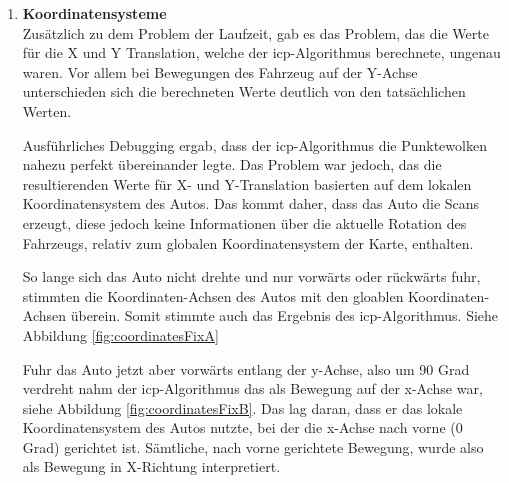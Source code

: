 \begin{enumerate}[leftmargin=*]
    \item \textbf{Koordinatensysteme} \\
    \label{coordinates_problem}Zusätzlich zu dem Problem der Laufzeit, gab es das Problem, das die Werte für die X und Y Translation, welche der \ac{icp}-Algorithmus berechnete, ungenau waren.
    Vor allem bei Bewegungen des Fahrzeug auf der Y-Achse unterschieden sich die berechneten Werte deutlich von den tatsächlichen Werten.
    
    Ausführliches Debugging ergab, dass der \ac{icp}-Algorithmus die Punktewolken nahezu perfekt übereinander legte.
    Das Problem war jedoch, das die resultierenden Werte für X- und Y-Translation basierten auf dem lokalen Koordinatensystem des Autos.
    Das kommt daher, dass das Auto die Scans erzeugt, diese jedoch keine Informationen über die aktuelle Rotation des Fahrzeugs, 
    relativ zum globalen Koordinatensystem der Karte, enthalten.
    
    So lange sich das Auto nicht drehte und nur vorwärts oder rückwärts fuhr, stimmten die Koordinaten-Achsen des Autos mit den gloablen Koordinaten-Achsen überein. 
    Somit stimmte auch das Ergebnis des \ac{icp}-Algorithmus.
    Siehe Abbildung \ref{fig:coordinatesFixA}

    Fuhr das Auto jetzt aber vorwärts entlang der y-Achse, also um 90 Grad verdreht
    nahm der \ac{icp}-Algorithmus das als Bewegung auf der x-Achse war,
    siehe Abbildung \ref{fig:coordinatesFixB}.
    Das lag daran, dass er das lokale Koordinatensystem des Autos nutzte, bei der die x-Achse nach vorne (0 Grad) gerichtet ist.
    Sämtliche, nach vorne gerichtete Bewegung, wurde also als Bewegung in X-Richtung interpretiert.


\end{enumerate}
